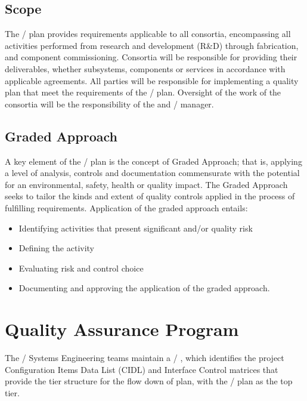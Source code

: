 \subsection{Scope}

The /  plan provides   requirements
applicable to all consortia, encompassing all activities performed
from research and development (R\&D) through fabrication, and component
commissioning. Consortia will be responsible for providing their
deliverables, whether subsystems, components or services in accordance
with applicable agreements. All parties will be responsible for
implementing a quality plan that meet the requirements of the
/  plan. Oversight of the work of the consortia will be
the responsibility of the   and /  manager. 

\subsection{Graded Approach}

A key element of the /  plan is the concept of Graded
Approach; that is, applying a level of analysis, controls and
documentation commensurate with the potential for an environmental,
safety, health or quality impact. The Graded Approach seeks to tailor
the kinds and extent of quality controls applied in the process of
fulfilling requirements. Application of the graded approach entails:
\begin{itemize}
 \item Identifying activities that present significant  and/or quality risk
 \item Defining the activity
 \item Evaluating risk and control choice
 \item Documenting and approving the application of the graded approach.
\end{itemize}

\section{Quality Assurance Program}

The / Systems Engineering teams maintain a /
, which identifies the project
Configuration Items Data List (CIDL) and Interface Control matrices
that provide the tier structure for the flow down of  plan, with
the /  plan as the top tier.

